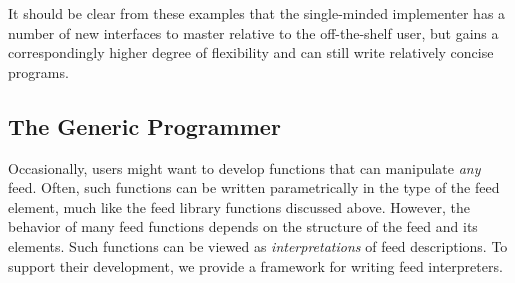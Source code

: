 It should be clear from these examples that the single-minded implementer
has a number of new interfaces to master relative to the off-the-shelf
user, but gains a correspondingly higher degree of flexibility and can
still write relatively concise programs.


\subsection{The Generic Programmer}


Occasionally, users might want to develop functions that can
manipulate {\it any} feed. 
Often, such functions can be written parametrically
in the type of the feed element, much like the feed
library functions discussed above. However, the behavior of many feed
functions depends on the structure of the feed and its
elements. Such functions can be viewed as {\it interpretations} of
feed descriptions. To support their development, we provide a
framework for writing feed interpreters.


